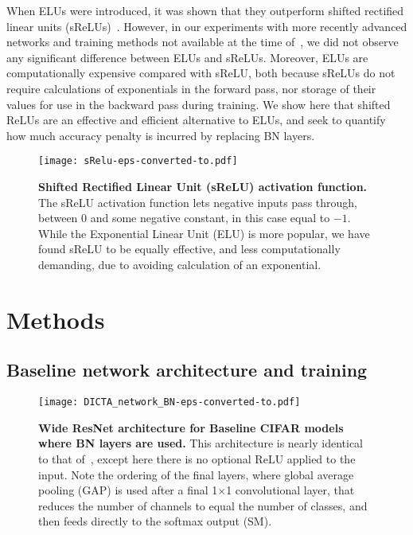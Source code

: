 \documentclass[conference]{IEEEtran}
\begin{document}
When ELUs were introduced, it was shown that they outperform shifted rectified linear units (sReLUs)~\cite{Clevert.15}. However, in our experiments with more recently advanced networks and training methods not available at the time of~\cite{Clevert.15}, we did not observe any significant difference between ELUs and sReLUs. Moreover, ELUs are computationally expensive compared with sReLU, both because sReLUs do not require calculations of exponentials in the forward pass, nor storage of their values for use in the backward pass during training. We show here that shifted ReLUs are an effective and efficient alternative to ELUs, and seek to quantify how much accuracy penalty is incurred by replacing BN layers.

\begin{figure}[h]
\begin{center}
{\texttt{[image: sRelu-eps-converted-to.pdf]}}
\end{center}
\caption{{\bf  Shifted Rectified Linear Unit (sReLU) activation function.} The sReLU activation function lets negative inputs pass through, between 0 and some negative constant, in this case equal to $-1$. While the Exponential Linear Unit (ELU) is more popular, we have found sReLU to be equally effective, and less computationally demanding, due to avoiding calculation of an exponential.}\label{fig:srelu}
\end{figure}





\section{Methods}\label{S3}

\subsection{Baseline network architecture and training}

\begin{figure*}[ht]
\begin{center}
{\texttt{[image: DICTA\_network\_BN-eps-converted-to.pdf]}}
\end{center}
\caption{{\bf  Wide ResNet architecture for Baseline CIFAR models where BN layers are used.} This architecture is nearly identical to that of~\cite{McDonnell.18}, except here there is no optional ReLU applied to the input. Note the ordering of the final layers, where global average pooling (GAP) is used after a final 1$\times$1 convolutional layer, that reduces the number of channels to equal the number of classes, and then feeds directly to the softmax output (SM).}\label{fig:arch1}
\end{figure*}
\end{document}
